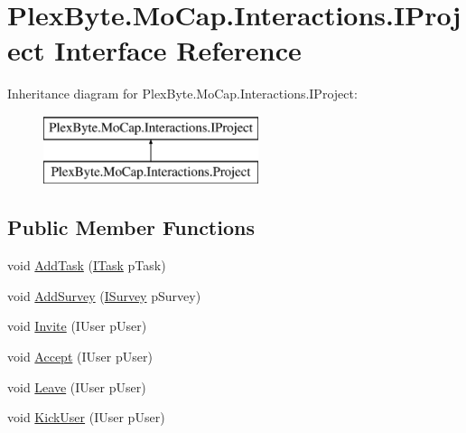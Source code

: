 \hypertarget{interface_plex_byte_1_1_mo_cap_1_1_interactions_1_1_i_project}{}\section{Plex\+Byte.\+Mo\+Cap.\+Interactions.\+I\+Project Interface Reference}
\label{interface_plex_byte_1_1_mo_cap_1_1_interactions_1_1_i_project}
Inheritance diagram for Plex\+Byte.\+Mo\+Cap.\+Interactions.\+I\+Project\+:\begin{figure}[H]
\begin{center}
\leavevmode
\includegraphics[height=2.000000cm]{interface_plex_byte_1_1_mo_cap_1_1_interactions_1_1_i_project}
\end{center}
\end{figure}
\subsection*{Public Member Functions}
\begin{DoxyCompactItemize}
\item 
void \hyperlink{interface_plex_byte_1_1_mo_cap_1_1_interactions_1_1_i_project_a9ce2ef4ee8b2d18da93405ea42113980}{Add\+Task} (\hyperlink{interface_plex_byte_1_1_mo_cap_1_1_interactions_1_1_i_task}{I\+Task} p\+Task)
\item 
void \hyperlink{interface_plex_byte_1_1_mo_cap_1_1_interactions_1_1_i_project_abd866426be16a3223f4930f6501e7114}{Add\+Survey} (\hyperlink{interface_plex_byte_1_1_mo_cap_1_1_interactions_1_1_i_survey}{I\+Survey} p\+Survey)
\item 
void \hyperlink{interface_plex_byte_1_1_mo_cap_1_1_interactions_1_1_i_project_a9ddad78d3c2f514d72f41cf9a6465956}{Invite} (I\+User p\+User)
\item 
void \hyperlink{interface_plex_byte_1_1_mo_cap_1_1_interactions_1_1_i_project_ab3bcc21a56e10b5e44381fe133420f71}{Accept} (I\+User p\+User)
\item 
void \hyperlink{interface_plex_byte_1_1_mo_cap_1_1_interactions_1_1_i_project_ad80e36a0f7acdba35550ebf57cbdda58}{Leave} (I\+User p\+User)
\item 
void \hyperlink{interface_plex_byte_1_1_mo_cap_1_1_interactions_1_1_i_project_a7c6e41fc59f57b0eba49a9e1a5d94d42}{Kick\+User} (I\+User p\+User)
\end{DoxyCompactItemize}
